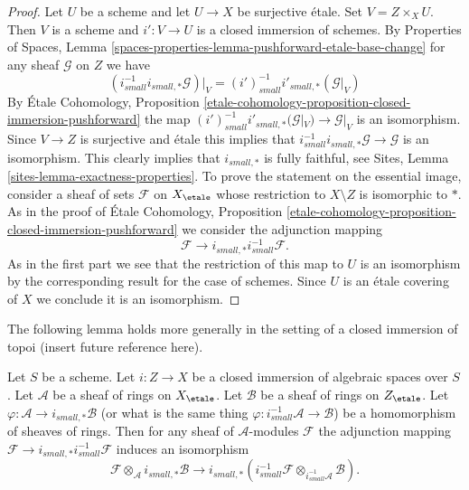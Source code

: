 \begin{proof}
Let $U$ be a scheme and let $U \to X$ be surjective \'etale.
Set $V = Z \times_X U$. Then $V$ is a scheme and $i' : V \to U$ is
a closed immersion of schemes. By
Properties of Spaces,
Lemma \ref{spaces-properties-lemma-pushforward-etale-base-change}
for any sheaf $\mathcal{G}$ on $Z$ we have
$$
(i_{small}^{-1}i_{small, *}\mathcal{G})|_V =
(i')_{small}^{-1}i'_{small, *}(\mathcal{G}|_V)
$$
By
\'Etale Cohomology, Proposition
\ref{etale-cohomology-proposition-closed-immersion-pushforward}
the map
$(i')_{small}^{-1}i'_{small, *}(\mathcal{G}|_V) \to \mathcal{G}|_V$
is an isomorphism. Since $V \to Z$ is surjective and \'etale this implies
that $i_{small}^{-1}i_{small, *}\mathcal{G} \to \mathcal{G}$ is an
isomorphism. This clearly implies that $i_{small, *}$ is fully faithful, see
Sites, Lemma \ref{sites-lemma-exactness-properties}.
To prove the statement on the essential image, consider a sheaf of sets
$\mathcal{F}$ on $X_\etale$ whose restriction to $X \setminus Z$ is
isomorphic to $*$. As in the proof of
\'Etale Cohomology, Proposition
\ref{etale-cohomology-proposition-closed-immersion-pushforward}
we consider the adjunction mapping
$$
\mathcal{F} \longrightarrow i_{small, *}i_{small}^{-1}\mathcal{F}.
$$
As in the first part we see that the restriction of this map to
$U$ is an isomorphism by the corresponding result for the case of
schemes. Since $U$ is an \'etale covering of $X$ we
conclude it is an isomorphism.
\end{proof}

\noindent
The following lemma holds more generally in the setting of a closed
immersion of topoi (insert future reference here).

\begin{lemma}
\label{lemma-closed-immersion-rings}
Let $S$ be a scheme. Let $i : Z \to X$ be a closed immersion of algebraic
spaces over $S$. Let $\mathcal{A}$ be a sheaf of rings on $X_\etale$.
Let $\mathcal{B}$ be a sheaf of rings on $Z_\etale$.
Let $\varphi : \mathcal{A} \to i_{small, *}\mathcal{B}$
(or what is the same thing
$\varphi : i_{small}^{-1}\mathcal{A} \to \mathcal{B}$)
be a homomorphism of sheaves of rings. Then for any sheaf of
$\mathcal{A}$-modules $\mathcal{F}$ the adjunction mapping
$\mathcal{F} \to i_{small, *}i_{small}^{-1}\mathcal{F}$
induces an isomorphism
$$
\mathcal{F} \otimes_\mathcal{A} i_{small, *}\mathcal{B}
\longrightarrow
i_{small, *}(i^{-1}_{small}\mathcal{F}
\otimes_{i_{small}^{-1}\mathcal{A}}
\mathcal{B}).
$$
\end{lemma}


